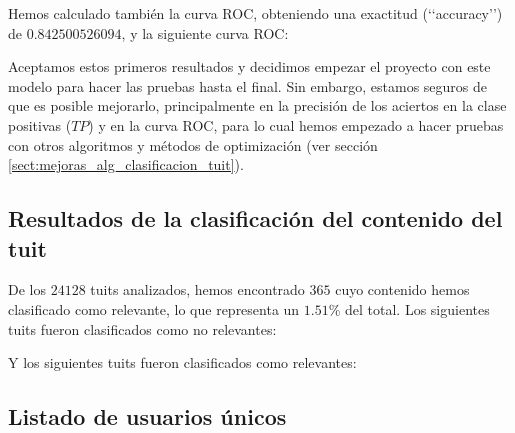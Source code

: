 Hemos calculado también la curva ROC, obteniendo
una exactitud (\lq\lq accuracy\rq\rq)
de $0.842500526094$, y la siguiente curva ROC:


Aceptamos estos primeros resultados y decidimos empezar el proyecto con este modelo para hacer las pruebas hasta el final. Sin embargo, estamos seguros de que es posible mejorarlo, principalmente en la precisión de los aciertos en la clase positivas ($TP$) y en la curva ROC, para lo cual hemos empezado a hacer pruebas con otros algoritmos y métodos de optimización (ver sección \ref{sect:mejoras_alg_clasificacion_tuit}).


\subsection{Resultados de la clasificación del contenido del tuit}
De los $24128$ tuits analizados, hemos encontrado $365$ cuyo contenido hemos clasificado como
re\-le\-van\-te, lo que representa un $1.51$\% del total. 
Los siguientes tuits fueron clasificados como no relevantes:


Y los siguientes tuits fueron clasificados como relevantes:


\subsection{Listado de usuarios únicos}
\label{subsect:duplicados1}

